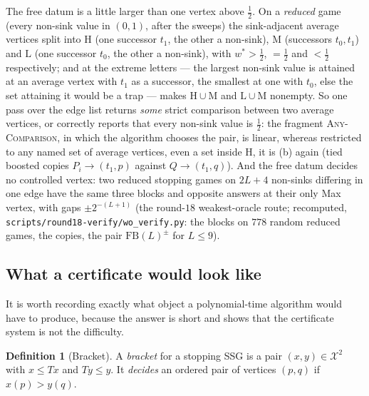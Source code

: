 \documentclass[11pt]{article}
\theoremstyle{plain}
\theoremstyle{definition}
\newtheorem{definition}[theorem]{Definition}
\begin{document}
The free datum is a little larger than one vertex above $\tfrac12$. On a
\emph{reduced} game (every non-sink value in $(0,1)$, after the sweeps)
the sink-adjacent average vertices split into $\mathrm H$ (one successor
$t_1$, the other a non-sink), $\mathrm M$ (successors $t_0,t_1$) and
$\mathrm L$ (one successor $t_0$, the other a non-sink), with
$w^\ast>\tfrac12$, $=\tfrac12$ and $<\tfrac12$ respectively; and
 at the extreme letters --- the largest non-sink
value is attained at an average vertex with $t_1$ as a successor, the
smallest at one with $t_0$, else the set attaining it would be a trap ---
makes $\mathrm H\cup\mathrm M$ and $\mathrm L\cup\mathrm M$ nonempty. So
one pass over the edge list returns \emph{some} strict comparison between
two average vertices, or correctly reports that every non-sink value is
$\tfrac12$: the fragment \textsc{Any-Comparison}, in which the algorithm
chooses the pair, is linear, whereas restricted to any named set of
average vertices, even a set inside $\mathrm H$, it is
(b) again (tied boosted copies $P_i\to(t_1,p)$
against $Q\to(t_1,q)$). And the free datum decides no controlled vertex:
two reduced stopping games on $2L+4$ non-sinks differing in one edge
have the same three blocks and opposite answers at their only Max vertex,
with gaps $\pm2^{-(L+1)}$ (the round-$18$ weakest-oracle route;
recomputed, \texttt{scripts/round18-verify/wo\_verify.py}: the blocks on
$778$ random reduced games, the copies, the pair $\mathrm{FB}(L)^{\pm}$
for $L\le9$).

\subsection{What a certificate would look like}

It is worth recording exactly what object a polynomial-time algorithm
would have to produce, because the answer is short and shows that the
certificate system is not the difficulty.

\begin{definition}[Bracket]\label{def:bracket}
A \emph{bracket} for a stopping SSG is a pair $(x,y)\in\mathcal{X}^2$ with
$x\le Tx$ and $Ty\le y$. It \emph{decides} an ordered pair of vertices
$(p,q)$ if $x(p)>y(q)$.
\end{definition}
\end{document}

